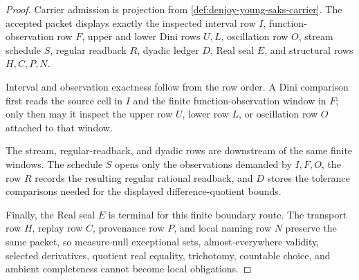 \begin{proof}
Carrier admission is projection from \autoref{def:denjoy-young-saks-carrier}. The accepted packet displays exactly the inspected interval row $I$, function-observation row $F$, upper and lower Dini rows $U,L$, oscillation row $O$, stream schedule $S$, regular readback $R$, dyadic ledger $D$, Real seal $E$, and structural rows $H,C,P,N$.

Interval and observation exactness follow from the row order. A Dini comparison first reads the source cell in $I$ and the finite function-observation window in $F$; only then may it inspect the upper row $U$, lower row $L$, or oscillation row $O$ attached to that window.

The stream, regular-readback, and dyadic rows are downstream of the same finite windows. The schedule $S$ opens only the observations demanded by $I,F,O$, the row $R$ records the resulting regular rational readback, and $D$ stores the tolerance comparisons needed for the displayed difference-quotient bounds.

Finally, the Real seal $E$ is terminal for this finite boundary route. The transport row $H$, replay row $C$, provenance row $P$, and local naming row $N$ preserve the same packet, so measure-null exceptional sets, almost-everywhere validity, selected derivatives, quotient real equality, trichotomy, countable choice, and ambient completeness cannot become local obligations.
\end{proof}

